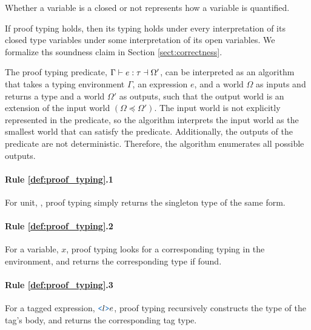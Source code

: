 \documentclass[acmsmall]{acmart}
\theoremstyle{definition}
\begin{document}
Whether a variable is a closed or not represents how a variable is quantified.

If proof typing holds, then its typing holds under every interpretation of its closed type variables
under some interpretation of its open variables.
We formalize ths soundness claim in Section \ref{sect:correctness}. 

The proof typing predicate, $\Gamma \vdash e : \tau \dashv \Omega'$, can 
be interpreted as an algorithm that takes a typing environment $\Gamma$, an expression $e$,
and a world $\Omega$ as inputs and returns a type and a world $\Omega'$ as outputs,
such that the output world is an extension of the input world $(\Omega \preceq \Omega')$.
The input world is not explicitly represented in the predicate, so the algorithm
interprets the input world as the smallest world that can satisfy the predicate. 
Additionally, the outputs of the predicate are not deterministic. Therefore, the algorithm
enumerates all possible outputs.



\paragraph{Rule \ref{def:proof_typing}.1}
For unit, , proof typing simply returns the singleton type of the same
form. 

\paragraph{Rule \ref{def:proof_typing}.2}
For a variable, $x$, proof typing looks
for a corresponding typing in the environment, and returns the 
corresponding type if found.

\paragraph{Rule \ref{def:proof_typing}.3}
For a tagged expression, $\obj{<}l\obj{>}e$, proof typing recursively 
constructs the type of the tag's body,
and returns the corresponding tag type.
\end{document}
